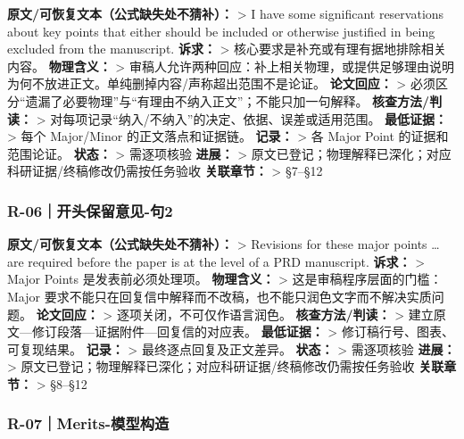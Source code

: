 \documentclass[
  chinese,
  UTF8]{ctexart}
\begin{document}
\textbf{原文/可恢复文本（公式缺失处不猜补）：} \textgreater{} I have
some significant reservations about key points that either should be
included or otherwise justified in being excluded from the manuscript.
\textbf{诉求：} \textgreater{} 核心要求是补充或有理有据地排除相关内容。
\textbf{物理含义：} \textgreater{}
审稿人允许两种回应：补上相关物理，或提供足够理由说明为何不放进正文。单纯删掉内容/声称超出范围不是论证。
\textbf{论文回应：} \textgreater{}
必须区分``遗漏了必要物理''与``有理由不纳入正文''；不能只加一句解释。
\textbf{核查方法/判读：} \textgreater{}
对每项记录``纳入/不纳入''的决定、依据、误差或适用范围。
\textbf{最低证据：} \textgreater{} 每个 Major/Minor 的正文落点和证据链。
\textbf{记录：} \textgreater{} 各 Major Point 的证据和范围论证。
\textbf{状态：} \textgreater{} 需逐项核验 \textbf{进展：} \textgreater{}
原文已登记；物理解释已深化；对应科研证据/终稿修改仍需按任务验收
\textbf{关联章节：} \textgreater{} §7--§12

\subsubsection{R-06｜开头保留意见-句2}\label{r-06ux5f00ux5934ux4fddux7559ux610fux89c1-ux53e52}

\textbf{原文/可恢复文本（公式缺失处不猜补）：} \textgreater{} Revisions
for these major points \ldots{} are required before the paper is at the
level of a PRD manuscript. \textbf{诉求：} \textgreater{} Major Points
是发表前必须处理项。 \textbf{物理含义：} \textgreater{}
这是审稿程序层面的门槛：Major
要求不能只在回复信中解释而不改稿，也不能只润色文字而不解决实质问题。
\textbf{论文回应：} \textgreater{} 逐项关闭，不可仅作语言润色。
\textbf{核查方法/判读：} \textgreater{}
建立原文---修订段落---证据附件---回复信的对应表。 \textbf{最低证据：}
\textgreater{} 修订稿行号、图表、可复现结果。 \textbf{记录：}
\textgreater{} 最终逐点回复及正文差异。 \textbf{状态：} \textgreater{}
需逐项核验 \textbf{进展：} \textgreater{}
原文已登记；物理解释已深化；对应科研证据/终稿修改仍需按任务验收
\textbf{关联章节：} \textgreater{} §8--§12

\subsubsection{R-07｜Merits-模型构造}\label{r-07merits-ux6a21ux578bux6784ux9020}
\end{document}
